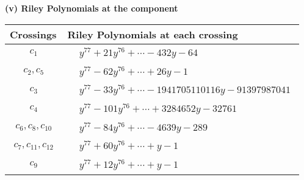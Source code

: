 \documentclass[1p]{elsarticle_modified}
\theoremstyle{definition}
\begin{document}
\newpage\renewcommand{\arraystretch}{1}
\flushleft \textbf{(v) Riley Polynomials at the component}\newline \\
\begin{tabular}{m{50pt}|m{274pt}}
Crossings & \hspace{64pt}Riley Polynomials at each crossing \\
\hline $$\begin{aligned}c_{1}\end{aligned}$$&$\begin{aligned}
&y^{77}+21 y^{76}+\cdots-432 y-64
\end{aligned}$\\
\hline $$\begin{aligned}c_{2},c_{5}\end{aligned}$$&$\begin{aligned}
&y^{77}-62 y^{76}+\cdots+26 y-1
\end{aligned}$\\
\hline $$\begin{aligned}c_{3}\end{aligned}$$&$\begin{aligned}
&y^{77}-33 y^{76}+\cdots-1941705110116 y-91397987041
\end{aligned}$\\
\hline $$\begin{aligned}c_{4}\end{aligned}$$&$\begin{aligned}
&y^{77}-101 y^{76}+\cdots+3284652 y-32761
\end{aligned}$\\
\hline $$\begin{aligned}c_{6},c_{8},c_{10}\end{aligned}$$&$\begin{aligned}
&y^{77}-84 y^{76}+\cdots-4639 y-289
\end{aligned}$\\
\hline $$\begin{aligned}c_{7},c_{11},c_{12}\end{aligned}$$&$\begin{aligned}
&y^{77}+60 y^{76}+\cdots+y-1
\end{aligned}$\\
\hline $$\begin{aligned}c_{9}\end{aligned}$$&$\begin{aligned}
&y^{77}+12 y^{76}+\cdots+y-1
\end{aligned}$\\
\hline
\end{tabular}\\~\\
\end{document}
